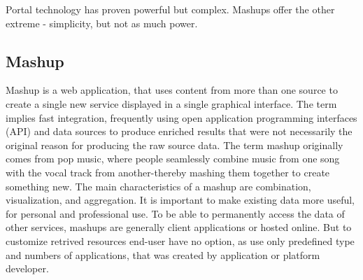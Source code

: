 		Portal technology has proven powerful but complex. Mashups offer the other extreme - simplicity, but not as much power. 

	\subsection{Mashup}

		Mashup is a web application, that uses content from more than one source to create a single new service displayed in a single graphical interface. The term implies fast integration, frequently using open application programming interfaces (API) and data sources to produce enriched results that were not necessarily the original reason for producing the raw source data. The term mashup originally comes from pop music, where people seamlessly combine music from one song with the vocal track from another-thereby mashing them together to create something new. The main characteristics of a mashup are combination, visualization, and aggregation. It is important to make existing data more useful, for personal and professional use. To be able to permanently access the data of other services, mashups are generally client applications or hosted online. But to customize retrived resources end-user have no option, as use only predefined type and numbers of applications, that was created by application or platform developer. 

